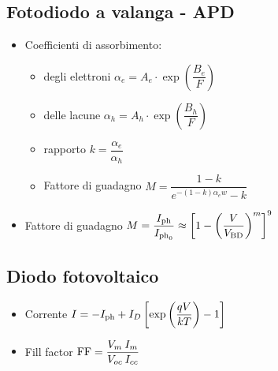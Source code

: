 \documentclass{article}
\begin{document}
\subsection{Fotodiodo a valanga - APD}
\begin{itemize}
  \item Coefficienti di assorbimento:
        \begin{itemize}
          \item degli elettroni \( \alpha_e = A_e \cdot \exp\left(\dfrac{B_e}{F}\right) \)
          \item delle lacune \( \alpha_h = A_h \cdot \exp\left(\dfrac{B_h}{F}\right) \)
          \item rapporto \( k = \dfrac{\alpha_e}{\alpha_h} \)
          \item Fattore di guadagno \( M = \dfrac{1 - k}{e^{-(1-k) \alpha_e w} - k } \)
        \end{itemize}
  \item Fattore di guadagno \( M = \dfrac{I_{\textnormal{ph}}}{I_{\textnormal{ph}_0}} \approx \left[ 1-\left( \dfrac{V}{V_\textnormal{BD}} \right) ^ m \right] ^ {9} \)
\end{itemize}

\subsection{Diodo fotovoltaico}
\begin{itemize}
  \item Corrente \( I = - I_{\textnormal{ph}} + I_D \left[\exp\left(\dfrac{qV}{kT}\right) - 1 \right] \)
  \item Fill factor \( \textnormal{FF} = \dfrac{V_m \: I_m}{V_{oc} \: I_{cc}} \)
\end{itemize}
\end{document}
